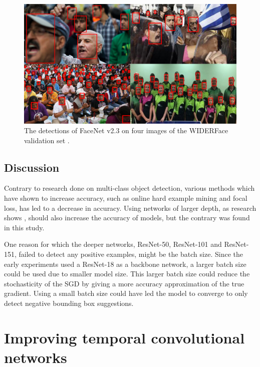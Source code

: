 \documentclass[a4paper, twoside]{article}
\begin{document}
\begin{figure}[h]
\begin{center}
    \includegraphics[width=16cm]{figfacedetection.png}\caption{The detections of FaceNet v2.3 on four images of the WIDERFace validation set \cite{WIDERFace}.} \label{figwiderfaceval}
\end{center}
\end{figure}

\subsection{Discussion}
Contrary to research done on multi-class object detection, various methods which have shown to increase accuracy, such as online hard example mining and focal loss, has led to a decrease in accuracy. Using networks of larger depth, as research shows \cite{retinanet} \cite{resnet}, should also increase the accuracy of models, but the contrary was found in this study.

One reason for which the deeper networks, ResNet-50, ResNet-101 and ResNet-151, failed to detect any positive examples, might be the batch size. Since the early experiments used a ResNet-18 as a backbone network, a larger batch size could be used due to smaller model size. This larger batch size could reduce the stochasticity of the SGD by giving a more accuracy approximation of the true gradient. Using a small batch size could have led the model to converge to only detect negative bounding box suggestions.


\section{Improving temporal convolutional networks}
\end{document}
